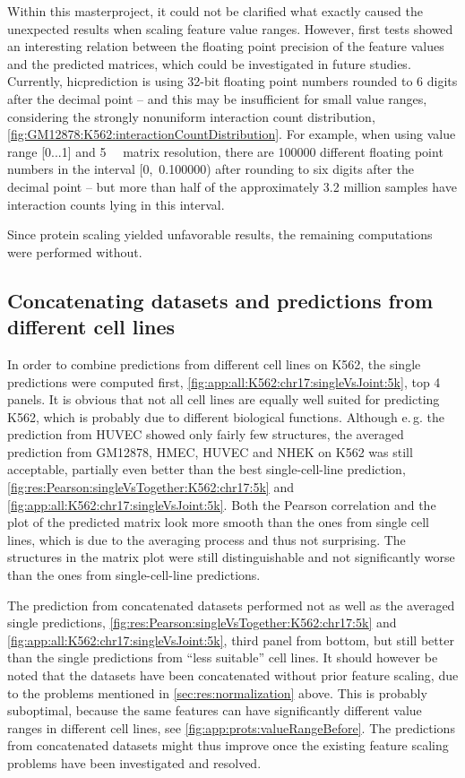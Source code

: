 Within this masterproject, it could not be clarified what exactly caused the
unexpected results when scaling feature value ranges.
However, first tests showed an interesting relation between the
floating point precision of the feature values and the predicted matrices,
which could be investigated in future studies.
Currently, hicprediction is using 32-bit floating point numbers rounded
to 6 digits after the decimal point -- and this may be insufficient
for small value ranges, considering the strongly nonuniform interaction count distribution, 
\autoref{fig:GM12878:K562:interactionCountDistribution}.
For example, when using value range [0...1] and \SI{5}{\kilo\bp} matrix resolution, 
there are \num{100000} different floating point numbers in the 
interval [0,~0.100000) after rounding to six digits after the decimal point -- but more than half of the approximately 3.2 million samples have interaction 
counts lying in this interval.

Since protein scaling yielded unfavorable results,
the remaining computations were performed without.

\subsection{Concatenating datasets and predictions from different cell lines}\label{sec:res:concat}
In order to combine predictions from different cell lines on K562, 
the single predictions were computed first, \autoref{fig:app:all:K562:chr17:singleVsJoint:5k},
top 4 panels.
It is obvious that not all cell lines  are equally well suited for predicting K562,
which is probably due to different biological functions.
Although e.\,g. the prediction from HUVEC showed only fairly few structures,
the averaged prediction from GM12878, HMEC, HUVEC and NHEK on K562 was still acceptable,
partially even better than the best single-cell-line prediction, 
\autoref{fig:res:Pearson:singleVsTogether:K562:chr17:5k} and 
\ref{fig:app:all:K562:chr17:singleVsJoint:5k}. 
Both the Pearson correlation and the plot of the predicted matrix look more smooth than the ones
from single cell lines, which is due to the averaging process and thus not surprising.
The structures in the matrix plot were still distinguishable and not significantly worse
than the ones from single-cell-line predictions.

The prediction from concatenated datasets performed not as well as the averaged single predictions,
\autoref{fig:res:Pearson:singleVsTogether:K562:chr17:5k} and \ref{fig:app:all:K562:chr17:singleVsJoint:5k}, third panel from bottom,
but still better than the single predictions from ``less suitable'' cell lines. 
It should however be noted that the datasets have been concatenated without prior feature scaling, due 
to the problems mentioned in \autoref{sec:res:normalization} above.
This is probably suboptimal, because the same features can have significantly different value ranges in different cell lines,
see \autoref{fig:app:prots:valueRangeBefore}.
The predictions from concatenated datasets might thus improve once the 
existing feature scaling problems have been investigated and resolved.



